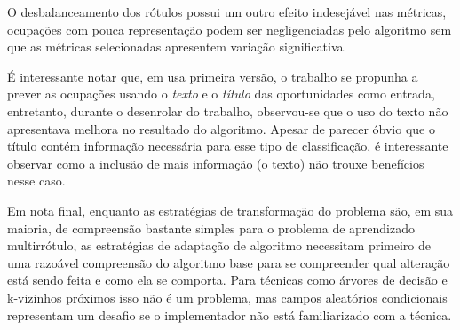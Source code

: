 \documentclass[runningheads,a4paper]{llncs}
\begin{document}
O desbalanceamento dos rótulos possui um outro efeito indesejável nas métricas, ocupações com pouca representação podem ser negligenciadas pelo algoritmo sem que as métricas selecionadas apresentem variação significativa.

É interessante notar que, em usa primeira versão, o trabalho se propunha a prever as ocupações usando o \textit{texto} e o \textit{título} das oportunidades como entrada, entretanto, durante o desenrolar do trabalho, observou-se que o uso do texto não apresentava melhora no resultado do algoritmo. Apesar de parecer óbvio que o título contém informação necessária para esse tipo de classificação, é interessante observar como a inclusão de mais informação (o texto) não trouxe benefícios nesse caso.

Em nota final, enquanto as estratégias de transformação do problema são, em sua maioria, de compreensão bastante simples para o problema de aprendizado multirrótulo, as estratégias de adaptação de algoritmo necessitam primeiro de uma razoável compreensão do algoritmo base para se compreender qual alteração está sendo feita e como ela se comporta. Para técnicas como árvores de decisão e k-vizinhos próximos isso não é um problema, mas campos aleatórios condicionais representam um desafio se o implementador não está familiarizado com a técnica.



\end{document}
